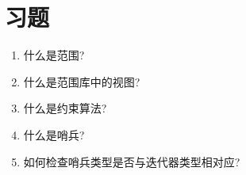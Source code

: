 \section{习题}
\begin{enumerate}
\item
什么是范围?

\item
什么是范围库中的视图?

\item
什么是约束算法?

\item
什么是哨兵?

\item
如何检查哨兵类型是否与迭代器类型相对应?
\end{enumerate}